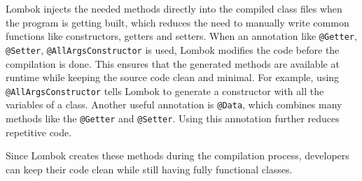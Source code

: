     \blankLine

    Lombok injects the needed methods directly into the compiled class files when the program is getting built, which reduces the need to manually write common functions like constructors, getters and setters. When an annotation like \texttt{@Getter}, \texttt{@Setter}, \texttt{@AllArgsConstructor} is used, Lombok modifies the code before the compilation is done. This ensures that the generated methods are available at runtime while keeping the source code clean and minimal. \newline
    For example, using \texttt{@AllArgsConstructor} tells Lombok to generate a constructor with all the variables of a class. Another useful annotation is \texttt{@Data}, which combines many methods like the \texttt{@Getter} and \texttt{@Setter}. Using this annotation further reduces repetitive code. 
    
    \blankLine
    
    Since Lombok creates these methods during the compilation process, developers can keep their code clean while still having fully functional classes. \Autocite{Andi:Lombok1, Andi:Lombok2, Andi:Lombok3}
    
